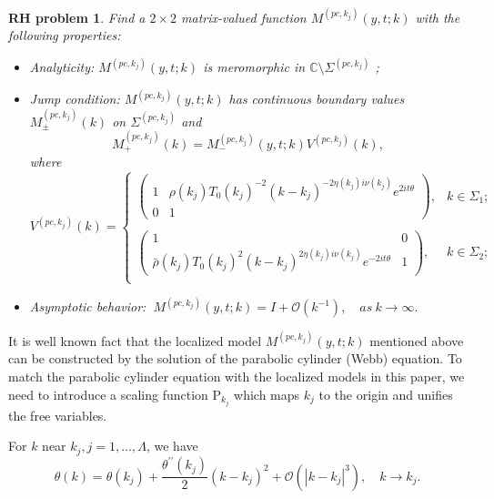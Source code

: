\documentclass[11pt]{article}
\numberwithin{equation}{section}
\newtheorem{RHP}{RH problem}
\begin{document}
\begin{RHP}
       Find a $2\times 2$ matrix-valued function $M^{(pc,k_j)}(y,t;k)$ with the following properties:
       \begin{itemize}
  \item Analyticity: $M^{(pc,k_j)}(y,t;k)$ is meromorphic in $\mathbb{C}\setminus \Sigma^{(pc,k_j)}$ ;
  \item Jump condition: $M^{(pc,k_j)}(y,t;k)$ has continuous boundary values $M^{(pc,k_j)}_{\pm}(k)$ on $\Sigma^{(pc,k_j)}$ and
 \begin{equation*}
M^{(pc,k_j)}_+(k)=M^{(pc,k_j)}_-(y,t;k)V^{(pc,k_j)}(k),
\end{equation*}
where
\begin{equation*}
V^{(pc,k_j)}(k)=\left\{\begin{array}{lll}
\left(\begin{array}{cc}
1 & \rho(k_j)T_0(k_j)^{-2} (k-k_j)^{-2\eta(k_j)i\nu(k_j)}e^{2it\theta}\\
0 & 1
\end{array}\right), & k\in \Sigma_{1};\\
\\
\left(\begin{array}{cc}
1 & 0\\
\bar{\rho}(k_j)T_0(k_j)^{2}(k-k_j)^{2\eta(k_j)i\nu(k_j)}e^{-2it\theta} & 1
\end{array}\right),  &k\in \Sigma_{2};\\

\end{array}\right.
\end{equation*}
  \item Asymptotic behavior:
  $\ M^{(pc,k_j)}(y,t;k)=I+\mathcal{O}(k^{-1}),\quad as \ k\to \infty.$
\end{itemize}
\end{RHP}





It is well known fact that the localized model $ M^{(pc,k_j)}(y,t;k)$ mentioned above can be constructed  by the solution of the parabolic cylinder (Webb) equation. To match the parabolic cylinder equation with the localized models in this paper, we need to introduce a scaling function $\mathrm{P}_{k_j}$ which maps $k_j$ to the origin and unifies the free variables.

For $k$ near $k_j, j=1,\dots,\Lambda$, we have
\begin{equation}\label{eq21}
\theta(k)=\theta\left(k_j\right)+\frac{\theta^{\prime \prime}\left(k_j\right)}{2}\left(k-k_j\right)^2+\mathcal{O}\left(\left|k-k_j\right|^3\right), \quad k \rightarrow k_j.
\end{equation}
\end{document}
